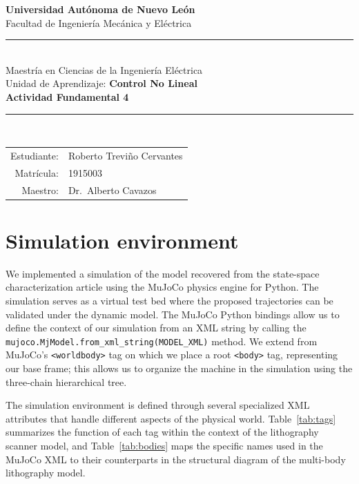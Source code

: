\documentclass[11pt,letterpaper]{article}
\begin{document}
\thispagestyle{empty}
\begin{center}
  {\bfseries Universidad Autónoma de Nuevo León}\\
  Facultad de Ingeniería Mecánica y Eléctrica\\[0.6em]
  \textcolor{uanlBlue}{\rule{\linewidth}{1pt}}\\[0.6em]
  Maestría en Ciencias de la Ingeniería Eléctrica\\
  Unidad de Aprendizaje: \textbf{Control No Lineal}\\[1.2em]
  {\LARGE\bfseries Actividad Fundamental 4}\\[1em]
  \textcolor{uanlBlue}{\rule{0.6\linewidth}{0.4pt}}\\[1em]
  \begin{tabular}{rl}
    Estudiante: & Roberto Treviño Cervantes \\
    Matrícula:  & 1915003 \\
    Maestro:    & Dr.\ Alberto Cavazos \\
  \end{tabular}
\end{center}

\vfill
\newpage
\setcounter{page}{1}


\section*{Simulation environment}

We implemented a simulation of the model recovered from the state-space characterization article using the MuJoCo physics engine for Python. The simulation serves as a virtual test bed where the proposed trajectories can be validated under the dynamic model. The MuJoCo Python bindings allow us to define the context of our simulation from an XML string by calling the \texttt{mujoco.MjModel.from\_xml\_string(MODEL\_XML)} method. We extend from MuJoCo's \texttt{<worldbody>} tag on which we place a root \texttt{<body>} tag, representing our base frame; this allows us to organize the machine in the simulation using the three-chain hierarchical tree.

The simulation environment is defined through several specialized XML attributes that handle different aspects of the physical world. Table~\ref{tab:tags} summarizes the function of each tag within the context of the lithography scanner model, and Table~\ref{tab:bodies} maps the specific names used in the MuJoCo XML to their counterparts in the structural diagram of the multi-body lithography model.
\end{document}
